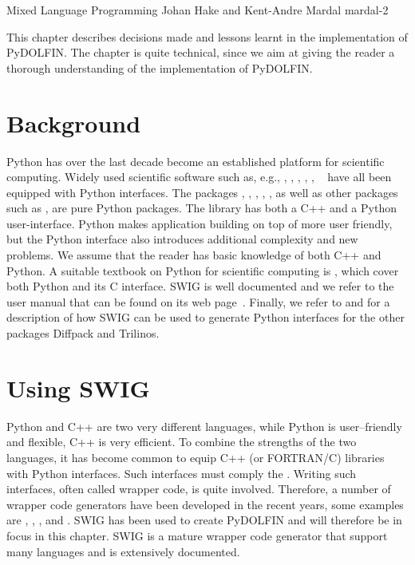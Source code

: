               {Mixed Language Programming}
              {Johan Hake and Kent-Andre Mardal}
              {mardal-2}


This chapter describes decisions made and lessons learnt
in the implementation of PyDOLFIN. The chapter is quite technical, since
we aim at giving the reader a thorough understanding of the implementation
of PyDOLFIN. 

\section{Background}
Python has over the last decade become an established platform
for scientific computing. Widely used scientific software such as, e.g.,
\citet{www:petsc}, \citet{www:hypre},
\citet{www:trilinos}, \cite{www:vtk}, \cite{www:vmtk},
\ginac~\citep{BauerFrinkKreckel2000} have all been equipped with Python
interfaces. The \fenics
packages \ferari, \fiat , \ffc,
\ufl, \viper, as well as  other packages such as 
\sympy\cite{CertikSeoanePetersonEtAl2009},
\scipy\cite{JonesOliphantPetersonEtAl2009} are pure Python packages.
The \dolfin library has both a C++ and a Python user-interface. Python
makes application building on top of \dolfin more user friendly, but
the Python interface also introduces additional complexity and new
problems.  We assume that the reader has basic knowledge of both C++
and Python. A suitable textbook on Python for scientific computing is
\cite{Langtangen2008}, which cover both Python and its C interface.
SWIG is well documented and we refer to the user manual that can be
found on its web page~\cite{www:swig}. Finally, we refer to
\citet{Langtangen2003b} and \citet{SalaSpotzHeroux2008} for a
description of how SWIG can be used to generate Python interfaces for
the other packages Diffpack and Trilinos.


\section{Using SWIG}

Python and C++ are two very different languages, while Python is
user--friendly and flexible, C++ is very efficient. 
To combine the strengths of the two languages, it has become common
to equip C++ (or FORTRAN/C) libraries with Python interfaces. 
Such interfaces must comply the \citet{www:python-capi}.   
Writing such interfaces, often called wrapper code, is quite involved.
Therefore, a number of wrapper code generators have been developed in the
recent years, some examples are   
 \citet{Peterson}, \citet{SIP}, \citet{Siloon}, and \citet{www:swig}. 
 SWIG has been used to create PyDOLFIN and will therefore be in focus in
 this chapter. SWIG is a mature wrapper code generator that support many languages and is extensively documented.

